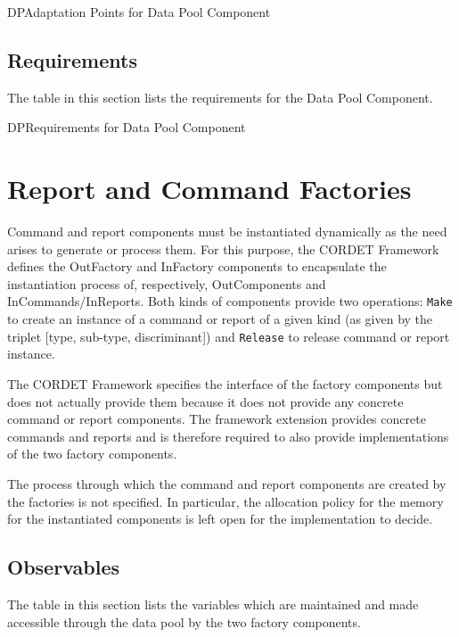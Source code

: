\documentclass[a4paper,10pt]{article}
\let\stdsection\section
\renewcommand\section{\newpage\stdsection}
\newenvironment{cr_req}[2]
{
\begin{longtable}{|l|p{11.8cm}|}
\caption{#2}\label{tab:Req-#1} \\
\hline
\rowcolor{light-gray}
\textbf{Req. ID} & \textbf{Requirement Text}\\
\hline\hline
\endfirsthead
\rowcolor{light-gray}
\textbf{Req. ID} & \textbf{Requirement Text}\\
\hline\hline
\endhead
\DTLforeach*[\DTLiseq{\cat}{#1}]{dbReq}{\cat=Category,\type=Type,\id=Id,\reqText=Text}
{\DTLiffirstrow{}{\\\hline}P-\cat-\id/\type & \textit{\reqText}}\\\hline
}
{\end{longtable}}
\newenvironment{cr_ap}[2]
{
\begin{longtable}{|l|p{4.7cm}|p{6.9cm}|}
\caption{#2}\label{tab:AP-#1} \\
\hline
\rowcolor{light-gray}
\textbf{AP ID} & \textbf{Adaptation Point} & \textbf{Default Value}\\
\hline\hline
\endfirsthead
\rowcolor{light-gray}
\textbf{AP ID} & \textbf{Adaptation Point} & \textbf{Default Value}\\
\hline\hline
\endhead
\DTLforeach*[\DTLiseq{\cat}{#1}]{dbAP}{\cat=Category,\origin=Origin,\id=Id,\ap=AP,\defValue=DefValue}
{\DTLiffirstrow{}{\\\hline}P-\cat-\id & \ap (\origin) & \defValue}\\\hline
}
{\end{longtable}}
\begin{document}
\begin{cr_ap}{DP}{Adaptation Points for Data Pool Component}
\end{cr_ap}

\newpage
\subsection{Requirements}
The table in this section lists the requirements for the Data Pool Component.

\begin{cr_req}{DP}{Requirements for Data Pool Component}
\end{cr_req}

\section{Report and Command Factories}\label{sec:repCmdFactories}
Command and report components must be instantiated dynamically as the need arises to generate or process them. For this purpose, the CORDET Framework defines the OutFactory and InFactory components to encapsulate the instantiation process of, respectively, OutComponents and InCommands/InReports. Both kinds of components provide two operations: \texttt{Make} to create an instance of a command or report of a given kind (as given by the triplet [type, sub-type, discriminant]) and \texttt{Release} to release command or report instance.

The CORDET Framework specifies the interface of the factory components but does not actually provide them because it does not provide any concrete command or report components. The framework extension provides concrete commands and reports and is therefore required to also provide implementations of the two factory components.

The process through which the command and report components are created by the factories is not specified. In particular, the allocation policy for the memory for the instantiated components is left open for the implementation to decide.

\subsection{Observables}
The table in this section lists the variables which are maintained and made accessible through the data pool by the two factory components.
\end{document}
